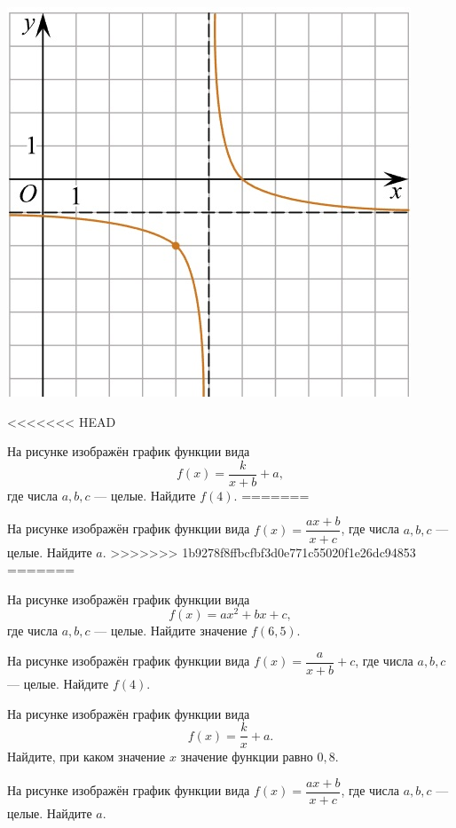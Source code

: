 \begin{class}[number=5]
\begin{listofex}
\begin{minipage}[t]{\bodywidth}
\begin{minipage}[t]{\bodywidth}
\begin{minipage}[t]{\bodywidth}
\begin{minipage}[t]{\picwidth}
			\includegraphics[align=t, width=\linewidth]{../pics/G101M4C5-2.jpg}
		\end{minipage}
		\item
<<<<<<< HEAD
		\begin{minipage}[t]{\bodywidth}
			На рисунке изображён график функции вида \[ f(x)=\dfrac{k}{x+b}+a, \] где числа \(a, b, c\) --- целые. Найдите \(f(4)\).
=======
		\begin{minipage}[t]{0.43\textwidth}
			На рисунке изображён график функции вида \(f(x)=\dfrac{ax+b}{x+c}\), где числа \(a, b, c\) --- целые. Найдите \(a\).
>>>>>>> 1b9278f8ffbcfbf3d0e771c55020f1e26dc94853
=======
		\begin{minipage}[t]{\bodywidth}
			На рисунке изображён график функции вида \[ f(x)=ax^2+bx+c, \] где числа \(a, b, c\) --- целые. Найдите значение \(f(6,5)\).
		\begin{minipage}[t]{0.43\textwidth}
			На рисунке изображён график функции вида \(f(x)=\dfrac{a}{x+b}+c\), где числа \(a, b, c\) --- целые. Найдите \(f(4)\).
		\begin{minipage}[t]{\bodywidth}
			На рисунке изображён график функции вида \[ f(x)=\dfrac{k}{x}+a. \] Найдите, при каком значение \( x \) значение функции равно \(0,8\).
		\item
		\begin{minipage}[t]{0.43\textwidth}
			На рисунке изображён график функции вида \(f(x)=\dfrac{ax+b}{x+c}\), где числа \(a, b, c\) --- целые. Найдите \(a\).

\end{minipage}
\end{minipage}
\end{minipage}
\end{minipage}
\end{minipage}
\end{minipage}
\end{minipage}
\end{minipage}
\end{minipage}
\end{listofex}
\end{class}
